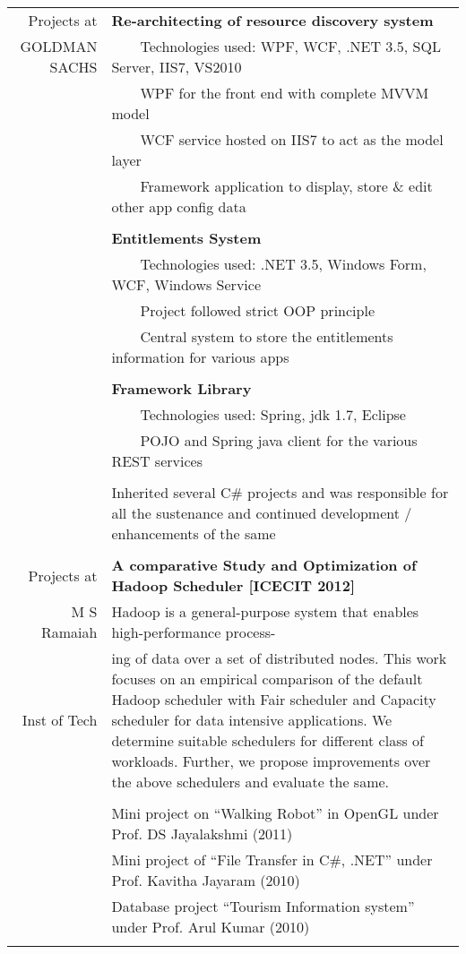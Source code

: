 \documentclass[a4paper,10pt]{article} %
\newcommand{\tabitem}{~~\llap{\textbullet}~~}
\begin{document}
\begin{tabular}{rp{11cm}}
Projects at  &  \textbf{Re-architecting of resource discovery system} \\
GOLDMAN SACHS &  \tabitem Technologies used: WPF, WCF, .NET 3.5, SQL Server, IIS7, VS2010 \\
& \tabitem WPF for the front end with complete MVVM model\\
& \tabitem WCF service hosted on IIS7 to act as the model layer\\
& \tabitem Framework application to display, store \& edit other app config data \\
&\\
& \textbf{Entitlements System}\\
& \tabitem Technologies used: .NET 3.5, Windows Form, WCF, Windows Service\\
& \tabitem Project followed strict OOP principle\\
& \tabitem Central system to store the entitlements information for various apps\\
&\\
& \textbf{Framework Library} \\
& \tabitem Technologies used: Spring, jdk 1.7, Eclipse\\
& \tabitem POJO and Spring java client for the various REST services \\ 
& \\
& Inherited several C\# projects and was responsible for all the sustenance and continued development / enhancements of the same\\
&\\
Projects at & \textbf{A comparative Study and Optimization of Hadoop Scheduler [ICECIT 2012]}\\ 
M S Ramaiah & \setlength{\leftskip}{0.4cm} Hadoop is a general-purpose system that enables high-performance process-\\
Inst of Tech & \setlength{\leftskip}{0.4cm}
ing  of data over a set of distributed nodes. This work focuses on an empirical comparison of the default Hadoop scheduler with Fair scheduler and Capacity scheduler for data intensive applications. We determine suitable schedulers for different class of workloads. Further, we propose improvements over the above schedulers and evaluate  the same.\\ 
& \\
& Mini project on “Walking Robot” in OpenGL under Prof. DS Jayalakshmi (2011)\\ 
& Mini project of “File Transfer in C\#, .NET” under Prof. Kavitha Jayaram (2010)\\
& Database project “Tourism Information system” under Prof. Arul Kumar (2010)\\
& \\
\end{tabular}
\\
\end{document}
